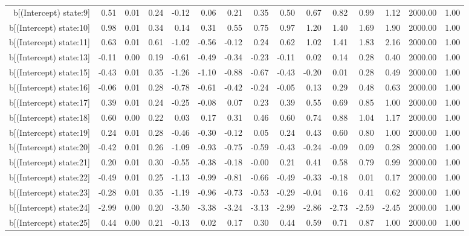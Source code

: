 \begin{table}[ht]
\begin{tabular}{rrrrrrrrrrrrrrr}
  b[(Intercept) state:9] & 0.51 & 0.01 & 0.24 & -0.12 & 0.06 & 0.21 & 0.35 & 0.50 & 0.67 & 0.82 & 0.99 & 1.12 & 2000.00 & 1.00 \\ 
  b[(Intercept) state:10] & 0.98 & 0.01 & 0.34 & 0.14 & 0.31 & 0.55 & 0.75 & 0.97 & 1.20 & 1.40 & 1.69 & 1.90 & 2000.00 & 1.00 \\ 
  b[(Intercept) state:11] & 0.63 & 0.01 & 0.61 & -1.02 & -0.56 & -0.12 & 0.24 & 0.62 & 1.02 & 1.41 & 1.83 & 2.16 & 2000.00 & 1.00 \\ 
  b[(Intercept) state:13] & -0.11 & 0.00 & 0.19 & -0.61 & -0.49 & -0.34 & -0.23 & -0.11 & 0.02 & 0.14 & 0.28 & 0.40 & 2000.00 & 1.00 \\ 
  b[(Intercept) state:15] & -0.43 & 0.01 & 0.35 & -1.26 & -1.10 & -0.88 & -0.67 & -0.43 & -0.20 & 0.01 & 0.28 & 0.49 & 2000.00 & 1.00 \\ 
  b[(Intercept) state:16] & -0.06 & 0.01 & 0.28 & -0.78 & -0.61 & -0.42 & -0.24 & -0.05 & 0.13 & 0.29 & 0.48 & 0.63 & 2000.00 & 1.00 \\ 
  b[(Intercept) state:17] & 0.39 & 0.01 & 0.24 & -0.25 & -0.08 & 0.07 & 0.23 & 0.39 & 0.55 & 0.69 & 0.85 & 1.00 & 2000.00 & 1.00 \\ 
  b[(Intercept) state:18] & 0.60 & 0.00 & 0.22 & 0.03 & 0.17 & 0.31 & 0.46 & 0.60 & 0.74 & 0.88 & 1.04 & 1.17 & 2000.00 & 1.00 \\ 
  b[(Intercept) state:19] & 0.24 & 0.01 & 0.28 & -0.46 & -0.30 & -0.12 & 0.05 & 0.24 & 0.43 & 0.60 & 0.80 & 1.00 & 2000.00 & 1.00 \\ 
  b[(Intercept) state:20] & -0.42 & 0.01 & 0.26 & -1.09 & -0.93 & -0.75 & -0.59 & -0.43 & -0.24 & -0.09 & 0.09 & 0.28 & 2000.00 & 1.00 \\ 
  b[(Intercept) state:21] & 0.20 & 0.01 & 0.30 & -0.55 & -0.38 & -0.18 & -0.00 & 0.21 & 0.41 & 0.58 & 0.79 & 0.99 & 2000.00 & 1.00 \\ 
  b[(Intercept) state:22] & -0.49 & 0.01 & 0.25 & -1.13 & -0.99 & -0.81 & -0.66 & -0.49 & -0.33 & -0.18 & 0.01 & 0.17 & 2000.00 & 1.00 \\ 
  b[(Intercept) state:23] & -0.28 & 0.01 & 0.35 & -1.19 & -0.96 & -0.73 & -0.53 & -0.29 & -0.04 & 0.16 & 0.41 & 0.62 & 2000.00 & 1.00 \\ 
  b[(Intercept) state:24] & -2.99 & 0.00 & 0.20 & -3.50 & -3.38 & -3.24 & -3.13 & -2.99 & -2.86 & -2.73 & -2.59 & -2.45 & 2000.00 & 1.00 \\ 
  b[(Intercept) state:25] & 0.44 & 0.00 & 0.21 & -0.13 & 0.02 & 0.17 & 0.30 & 0.44 & 0.59 & 0.71 & 0.87 & 1.00 & 2000.00 & 1.00 \\ 

\end{tabular}
\end{table}

